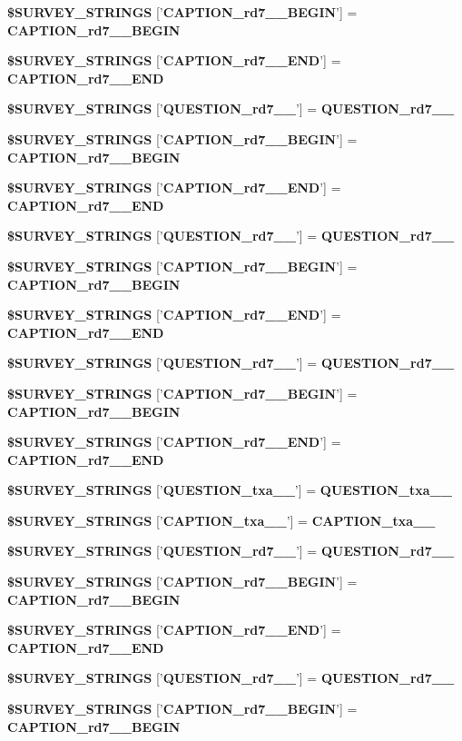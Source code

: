 \begin{CompactItemize}
{\bf \$SURVEY\_\-STRINGS} ['{\bf CAPTION\_\-rd7\_\_\-BEGIN}'] = {\bf CAPTION\_\-rd7\_\_\-BEGIN}
\item 
{\bf \$SURVEY\_\-STRINGS} ['{\bf CAPTION\_\-rd7\_\_\-END}'] = {\bf CAPTION\_\-rd7\_\_\-END}
\item 
{\bf \$SURVEY\_\-STRINGS} ['{\bf QUESTION\_\-rd7\_\_\-}'] = {\bf QUESTION\_\-rd7\_\_\-}
\item 
{\bf \$SURVEY\_\-STRINGS} ['{\bf CAPTION\_\-rd7\_\_\-BEGIN}'] = {\bf CAPTION\_\-rd7\_\_\-BEGIN}
\item 
{\bf \$SURVEY\_\-STRINGS} ['{\bf CAPTION\_\-rd7\_\_\-END}'] = {\bf CAPTION\_\-rd7\_\_\-END}
\item 
{\bf \$SURVEY\_\-STRINGS} ['{\bf QUESTION\_\-rd7\_\_\-}'] = {\bf QUESTION\_\-rd7\_\_\-}
\item 
{\bf \$SURVEY\_\-STRINGS} ['{\bf CAPTION\_\-rd7\_\_\-BEGIN}'] = {\bf CAPTION\_\-rd7\_\_\-BEGIN}
\item 
{\bf \$SURVEY\_\-STRINGS} ['{\bf CAPTION\_\-rd7\_\_\-END}'] = {\bf CAPTION\_\-rd7\_\_\-END}
\item 
{\bf \$SURVEY\_\-STRINGS} ['{\bf QUESTION\_\-rd7\_\_\-}'] = {\bf QUESTION\_\-rd7\_\_\-}
\item 
{\bf \$SURVEY\_\-STRINGS} ['{\bf CAPTION\_\-rd7\_\_\-BEGIN}'] = {\bf CAPTION\_\-rd7\_\_\-BEGIN}
\item 
{\bf \$SURVEY\_\-STRINGS} ['{\bf CAPTION\_\-rd7\_\_\-END}'] = {\bf CAPTION\_\-rd7\_\_\-END}
\item 
{\bf \$SURVEY\_\-STRINGS} ['{\bf QUESTION\_\-txa\_\_\-}'] = {\bf QUESTION\_\-txa\_\_\-}
\item 
{\bf \$SURVEY\_\-STRINGS} ['{\bf CAPTION\_\-txa\_\_\-}'] = {\bf CAPTION\_\-txa\_\_\-}
\item 
{\bf \$SURVEY\_\-STRINGS} ['{\bf QUESTION\_\-rd7\_\_\-}'] = {\bf QUESTION\_\-rd7\_\_\-}
\item 
{\bf \$SURVEY\_\-STRINGS} ['{\bf CAPTION\_\-rd7\_\_\-BEGIN}'] = {\bf CAPTION\_\-rd7\_\_\-BEGIN}
\item 
{\bf \$SURVEY\_\-STRINGS} ['{\bf CAPTION\_\-rd7\_\_\-END}'] = {\bf CAPTION\_\-rd7\_\_\-END}
\item 
{\bf \$SURVEY\_\-STRINGS} ['{\bf QUESTION\_\-rd7\_\_\-}'] = {\bf QUESTION\_\-rd7\_\_\-}
\item 
{\bf \$SURVEY\_\-STRINGS} ['{\bf CAPTION\_\-rd7\_\_\-BEGIN}'] = {\bf CAPTION\_\-rd7\_\_\-BEGIN}
\item 

\end{CompactItemize}
